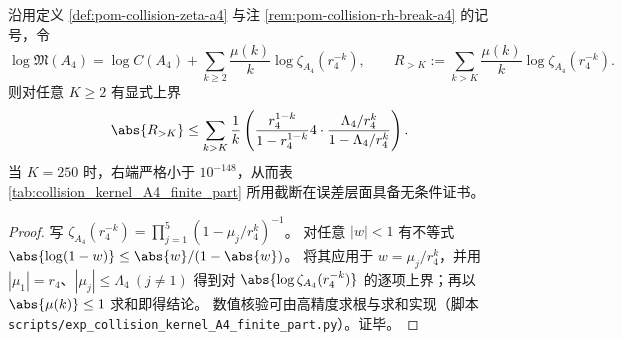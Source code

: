 \begin{proposition}\label{prop:pom-a4-mertens-tail-bound}
沿用定义 \ref{def:pom-collision-zeta-a4} 与注 \ref{rem:pom-collision-rh-break-a4} 的记号，令
\[
\log\mathfrak{M}(A_4)=\log C(A_4)+\sum_{k\ge 2}\frac{\mu(k)}{k}\log \zeta_{A_4}(r_4^{-k}),
\qquad
R_{>K}:=\sum_{k>K}\frac{\mu(k)}{k}\log \zeta_{A_4}(r_4^{-k}).
\]
则对任意 \(K\ge 2\) 有显式上界
\[
\abs{R_{>K}}
\le \sum_{k>K}\frac{1}{k}
\left(
\frac{r_4^{1-k}}{1-r_4^{1-k}}
4\cdot \frac{\Lambda_4/r_4^{k}}{1-\Lambda_4/r_4^{k}}
\right).
\]
当 \(K=250\) 时，右端严格小于 \(10^{-148}\)，从而表 \ref{tab:collision_kernel_A4_finite_part} 所用截断在误差层面具备无条件证书。
\end{proposition}
\begin{proof}
写
\(
\zeta_{A_4}(r_4^{-k})=\prod_{j=1}^{5}(1-\mu_j/r_4^k)^{-1}
\)。
对任意 \(|w|<1\) 有不等式 \(\abs{\log(1-w)}\le \abs{w}/(1-\abs{w})\)。
将其应用于 \(w=\mu_j/r_4^k\)，并用 \(|\mu_1|=r_4\)、\(|\mu_j|\le \Lambda_4\ (j\neq 1)\) 得到对 \(\abs{\log \zeta_{A_4}(r_4^{-k})}\) 的逐项上界；再以 \(\abs{\mu(k)}\le 1\) 求和即得结论。
数值核验可由高精度求根与求和实现（脚本 \texttt{scripts/exp\_collision\_kernel\_A4\_finite\_part.py}）。证毕。
\end{proof}
